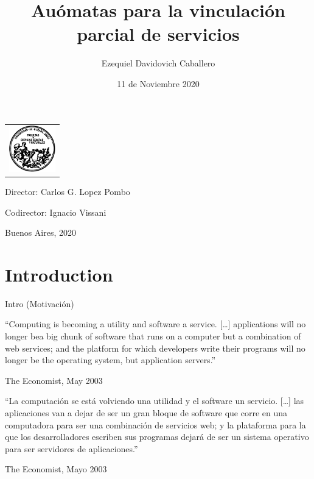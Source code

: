 \documentclass[10pt,xcolor={table,dvipsnames},t]{beamer}
\title{Auómatas para la vinculación parcial de servicios}
\author{Ezequiel Davidovich Caballero}
\institute{Departamento de Computación, Facultad de Ciencias Exactas y Naturales}
\date{11 de Noviembre 2020}
\begin{document}
\begin{frame}
\vspace{-2cm}
\begin{center}
\begin{tabular}{l}
\includegraphics[width=2cm]{logofcen.pdf}
\end{tabular}    
\end{center}

  \titlepage
  
  

{Director: Carlos G. Lopez Pombo}

\vspace{.2cm}

{Codirector: Ignacio Vissani}

\vspace{.2cm}

Buenos Aires, 2020

\end{frame}


\section{Introduction}
\begin{frame}{Intro (Motivación)}
\begin{center}
    “Computing is becoming a utility and software a service. […] applications will no longer bea big chunk of software that runs on a computer but a combination of web services; and the platform for which developers write their programs will no longer be the operating system, but application servers.”
\end{center}
The Economist, May 2003
\begin{center}
“La computación se está volviendo una utilidad y el software un servicio. […] las aplicaciones van a dejar de ser un gran bloque de software que corre en una computadora para ser una combinación de servicios web; y la plataforma para la que los desarrolladores escriben sus programas dejará de ser un sistema operativo para ser servidores de aplicaciones.”    
\end{center}
The Economist, Mayo 2003
\end{frame}
\end{document}
